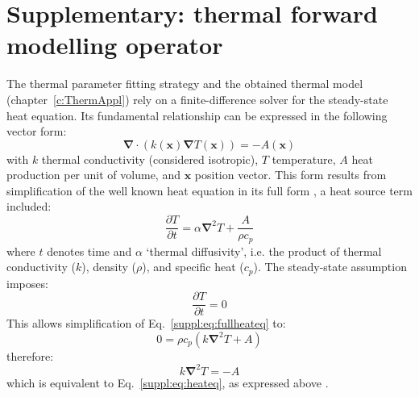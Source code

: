 \chapter{Supplementary: thermal forward modelling operator}
\label{c:ThermModel}

The thermal parameter fitting strategy and the obtained thermal model (chapter~\ref{c:ThermAppl}) rely on a finite-difference solver for the steady-state heat equation.
Its fundamental relationship can be expressed in the following vector form:
\begin{equation}
    \label{suppl:eq:heateq}
    \bm{\nabla} \cdot ( k(\bm{x}) \bm{\nabla} T(\bm{x}) ) = - A(\bm{x})
\end{equation}
with $k$ thermal conductivity (considered isotropic), $T$ temperature, $A$ heat production per unit of volume, and $\bm{x}$ position vector.
This form results from simplification of the well known heat equation in its full form \parencites{Fourier1822,Carslaw1959}, a heat source term included:
\begin{equation}
    \label{suppl:eq:fullheateq}
    \frac{\partial T}{\partial t} = \alpha \bm{\nabla}^2 T + \frac{A}{\rho c_p}
\end{equation}
where $t$ denotes time and $\alpha$ `thermal diffusivity', i.e. the product of thermal conductivity ($k$), density ($\rho$), and specific heat ($c_p$).
The steady-state assumption imposes:
\begin{equation}
    \label{suppl:eq:steadystate}
    \frac{\partial T}{\partial t} = 0
\end{equation}
This allows simplification of Eq.~\ref{suppl:eq:fullheateq} to:
\begin{equation}
    \label{suppl:eq:steadystatefullheateq}
    0 = \rho c_p \left( k \bm{\nabla}^2 T + A \right)
\end{equation}
therefore:
\begin{equation}
    \label{suppl:eq:steadystatefullheateq_simplified}
    k \bm{\nabla}^2 T = - A
\end{equation}
which is equivalent to Eq.~\ref{suppl:eq:heateq}, as expressed above \parencite[e.g. ][, chapter 3]{stuwe2007geodynamics}.

